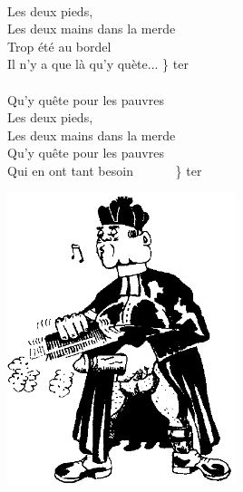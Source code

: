 {\\Les deux pieds, 
\\Les deux mains dans la merde
\\Trop été au bordel
\\Il n'y a que là qu'y quète... \} ter
\\\\Qu'y quête pour les pauvres
\\Les deux pieds, \
\\Les deux mains dans la merde
\\Qu'y quête pour les pauvres
\\Qui en ont tant besoin ~~~~~~\} ter\\
\begin{center}
\includegraphics[width=0.5\textwidth]{images/colline.png}
\end{center}
}

\breakpage